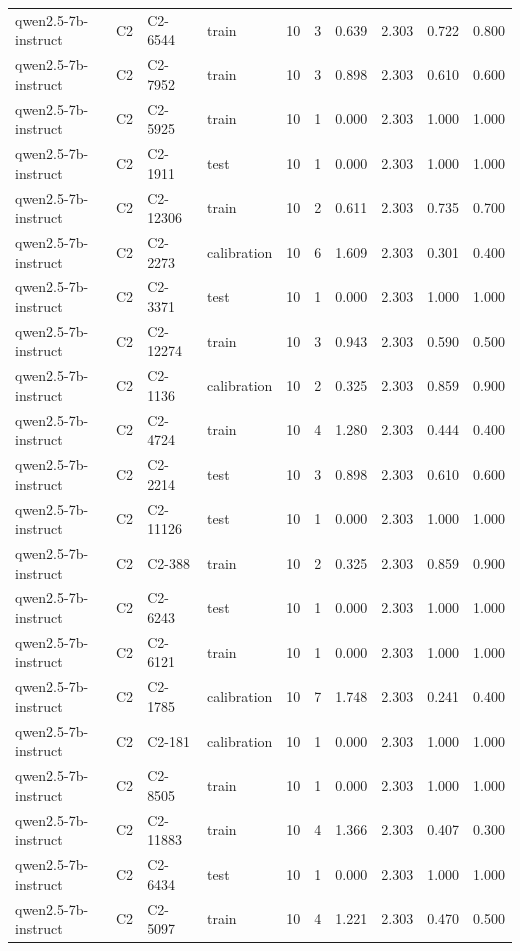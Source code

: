 \begin{table}
\begin{tabular}{llllrrrrrr}
qwen2.5-7b-instruct & C2 & C2-6544 & train & 10 & 3 & 0.639 & 2.303 & 0.722 & 0.800 \\
qwen2.5-7b-instruct & C2 & C2-7952 & train & 10 & 3 & 0.898 & 2.303 & 0.610 & 0.600 \\
qwen2.5-7b-instruct & C2 & C2-5925 & train & 10 & 1 & 0.000 & 2.303 & 1.000 & 1.000 \\
qwen2.5-7b-instruct & C2 & C2-1911 & test & 10 & 1 & 0.000 & 2.303 & 1.000 & 1.000 \\
qwen2.5-7b-instruct & C2 & C2-12306 & train & 10 & 2 & 0.611 & 2.303 & 0.735 & 0.700 \\
qwen2.5-7b-instruct & C2 & C2-2273 & calibration & 10 & 6 & 1.609 & 2.303 & 0.301 & 0.400 \\
qwen2.5-7b-instruct & C2 & C2-3371 & test & 10 & 1 & 0.000 & 2.303 & 1.000 & 1.000 \\
qwen2.5-7b-instruct & C2 & C2-12274 & train & 10 & 3 & 0.943 & 2.303 & 0.590 & 0.500 \\
qwen2.5-7b-instruct & C2 & C2-1136 & calibration & 10 & 2 & 0.325 & 2.303 & 0.859 & 0.900 \\
qwen2.5-7b-instruct & C2 & C2-4724 & train & 10 & 4 & 1.280 & 2.303 & 0.444 & 0.400 \\
qwen2.5-7b-instruct & C2 & C2-2214 & test & 10 & 3 & 0.898 & 2.303 & 0.610 & 0.600 \\
qwen2.5-7b-instruct & C2 & C2-11126 & test & 10 & 1 & 0.000 & 2.303 & 1.000 & 1.000 \\
qwen2.5-7b-instruct & C2 & C2-388 & train & 10 & 2 & 0.325 & 2.303 & 0.859 & 0.900 \\
qwen2.5-7b-instruct & C2 & C2-6243 & test & 10 & 1 & 0.000 & 2.303 & 1.000 & 1.000 \\
qwen2.5-7b-instruct & C2 & C2-6121 & train & 10 & 1 & 0.000 & 2.303 & 1.000 & 1.000 \\
qwen2.5-7b-instruct & C2 & C2-1785 & calibration & 10 & 7 & 1.748 & 2.303 & 0.241 & 0.400 \\
qwen2.5-7b-instruct & C2 & C2-181 & calibration & 10 & 1 & 0.000 & 2.303 & 1.000 & 1.000 \\
qwen2.5-7b-instruct & C2 & C2-8505 & train & 10 & 1 & 0.000 & 2.303 & 1.000 & 1.000 \\
qwen2.5-7b-instruct & C2 & C2-11883 & train & 10 & 4 & 1.366 & 2.303 & 0.407 & 0.300 \\
qwen2.5-7b-instruct & C2 & C2-6434 & test & 10 & 1 & 0.000 & 2.303 & 1.000 & 1.000 \\
qwen2.5-7b-instruct & C2 & C2-5097 & train & 10 & 4 & 1.221 & 2.303 & 0.470 & 0.500 \\

\end{tabular}
\end{table}
